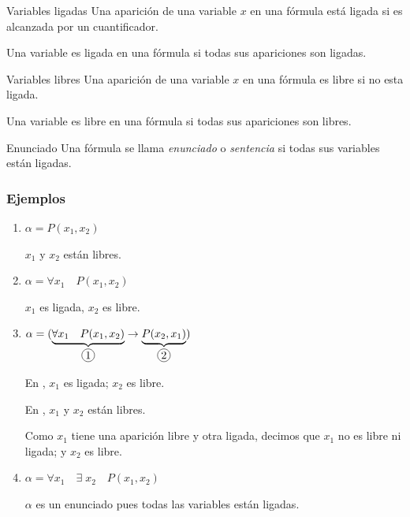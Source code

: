 \begin{definicion}{Variables ligadas}{}
    Una aparición de una variable $x$ en una fórmula está ligada si es 
    alcanzada por un cuantificador.

    \smallskip

    Una variable es ligada en una fórmula si todas sus apariciones son ligadas.

\end{definicion}

\medskip

\begin{definicion}{Variables libres}{}
    Una aparición de una variable $x$ en una fórmula es libre si no esta
    ligada. 

    \smallskip

    Una variable es libre en una fórmula si todas sus apariciones son libres.
\end{definicion}

\medskip

\begin{definicion}{Enunciado}{}
    Una fórmula se llama \textit{enunciado} o \textit{sentencia} si todas sus 
    variables están ligadas.
\end{definicion}


\subsubsection{Ejemplos}

\begin{enumerate}
    \item $\alpha = P(x_1, x_2)$

        $x_1$ y $x_2$ están libres.

    \item $\alpha = \forall x_1 \quad P(x_1, x_2)$

        $x_1$ es ligada, $x_2$ es libre.

    \item $\alpha = (\underbrace{\forall x_1 \quad P(x_1, x_2)}_{\circled{1}}
        \to \underbrace{P(x_2, x_1)}_{\circled{2}})$

        En , $x_1$ es ligada; $x_2$ es libre.

        En , $x_1$ y $x_2$ están libres.

        Como $x_1$ tiene una aparición libre y otra ligada, decimos que $x_1$
        no es libre ni ligada; y $x_2$ es libre.

    \item $\alpha = \forall x_1 \quad \exists\; x_2 \quad P(x_1, x_2)$

        $\alpha$ es un enunciado pues todas las variables están ligadas.
\end{enumerate}

